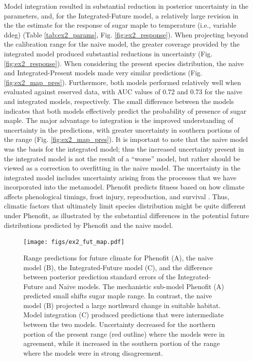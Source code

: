 \documentclass[11pt]{article}
\begin{document}
Model integration resulted in substantial reduction in posterior uncertainty in the parameters, and, for the Integrated-Future model, a relatively large revision in the the estimate for the response of sugar maple to temperature (i.e., variable ddeg) (Table \ref{tab:ex2_params}, Fig. \ref{fig:ex2_response}).
When projecting beyond the calibration range for the naive model, the greater coverage provided by the integrated model produced substantial reductions in uncertainty (Fig. \ref{fig:ex2_response}).
When considering the present species distribution, the naive and Integrated-Present models made very similar predictions (Fig. \ref{fig:ex2_map_pres}).
Furthermore, both models performed relatively well when evaluated against reserved data, with AUC values of 0.72 and 0.73 for the naive and integrated models, respectively.
The small difference between the models indicates that both models effectively predict the probability of presence of sugar maple.
The major advantage to integration is the improved understanding of uncertainty in the predictions, with greater uncertainty in southern portions of the range (Fig. \ref{fig:ex2_map_pres}).
It is important to note that the naive model was the basis for the integrated model; thus the increased uncertainty present in the integrated model is not the result of a ``worse'' model, but rather should be viewed as a correction to overfitting in the naive model. 
The uncertainty in the integrated model includes uncertainty arising from the processes that we have incorporated into the metamodel.
Phenofit predicts fitness based on how climate affects phenological timings, frost injury, reproduction, and survival \citep{Chuine2001, Morin2009}.
Thus, climatic factors that ultimately limit species distribution might be quite different under Phenofit, as illustrated by the substantial differences in the potential future distributions predicted by Phenofit and the naive model.


\begin{figure}[t]
\texttt{[image: figs/ex2\_fut\_map.pdf]}
\caption{Range predictions for future climate for Phenofit (A), the naive model (B), the Integrated-Future model (C), and the difference between posterior prediction standard errors of the Integrated-Future and Naive models.
The mechanistic sub-model Phenofit (A) predicted small shifts sugar maple range.
In contrast, the naive model (B) projected a large northward change in suitable habitat.
Model integration (C) produced predictions that were intermediate between the two models.
Uncertainty decreased for the northern portion of the present range (red outline) where the models were in agreement, while it increased in the southern portion of the range where the models were in strong disagreement.}
\label{fig:ex2_map_fut}
\end{figure}
\end{document}
